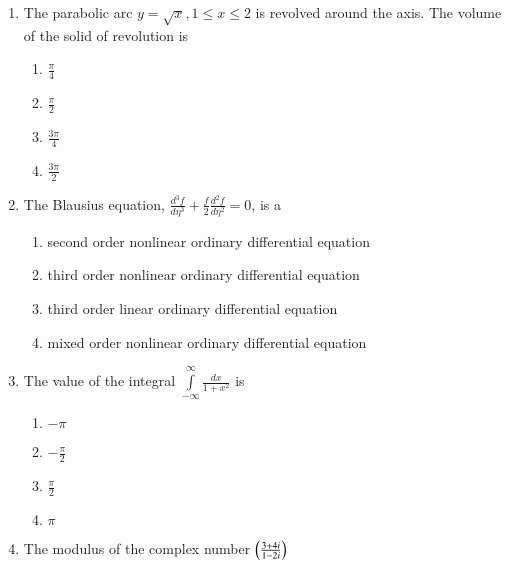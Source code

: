 \documentclass[journal]{IEEEtran}
\begin{document}
\begin{enumerate}
\setcounter{enumi}{0}
 
    \item The parabolic arc $y=\sqrt{x},1\leq x\leq2$  is revolved around the axis. The volume of the solid of revolution is

        \begin{multicols}{4}
            \begin{enumerate}
                \item $\frac{\pi}{4}$
                \item $\frac{\pi}{2}$
                \item $\frac{3\pi}{4}$
                \item $\frac{3\pi}{2}$
            \end{enumerate}
        \end{multicols}

    \item The Blausius equation, $\frac{d^3f}{d\eta^3}+\frac{f}{2}\frac{d^2f}{d\eta^2}=0$, is a 


            \begin{enumerate}
                \item second order nonlinear ordinary differential equation
                \item third order nonlinear ordinary differential equation
                \item third order linear ordinary differential equation
                \item mixed order nonlinear ordinary differential equation
            \end{enumerate}


    \item The value of the integral $\overset{\infty}{\underset{-\infty}{\int}}\frac{dx}{1+x^2}$ is

        \begin{multicols}{4}
            \begin{enumerate}
                \item $-\pi$
                \item $-\frac{\pi}{2}$
                \item $\frac{\pi}{2}$
                \item $\pi$
            \end{enumerate}
        \end{multicols}


    \item The modulus of the complex number $\left(\frac{3+4i}{1-2i}\right)$
    

\end{enumerate}
\end{document}

